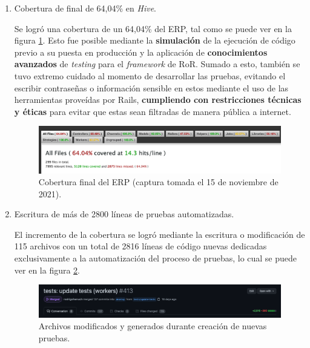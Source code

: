   \begin{enumerate}
    \item Cobertura de final de 64,04\% en \textit{Hive}.
    
    Se logró una cobertura de un 64,04\% del ERP, tal como se puede ver en la figura \ref{fig:testing_final}. Esto fue posible mediante la \textbf{simulación} de la ejecución de código previo a su puesta en producción y la aplicación de \textbf{conocimientos avanzados} de \textit{testing} para el \textit{framework} de RoR. Sumado a esto, también se tuvo extremo cuidado al momento de desarrollar las pruebas, evitando el escribir contraseñas o información sensible en estos mediante el uso de las herramientas proveídas por Rails, \textbf{cumpliendo con restricciones técnicas y éticas} para evitar que estas sean filtradas de manera pública a internet.
    
    \begin{figure}[H]
      \centering
      \includegraphics[width=\linewidth]{figures/testing/testing_final.png}
      \caption{Cobertura final del ERP (captura tomada el 15 de noviembre de 2021).}
      \label{fig:testing_final}
    \end{figure}

    \item Escritura de más de 2800 líneas de pruebas automatizadas.
    
    El incremento de la cobertura se logró mediante la escritura o modificación de 115 archivos con un total de 2816 líneas de código nuevas dedicadas exclusivamente a la automatización del proceso de pruebas, lo cual se puede ver en la figura \ref{fig:testing_file_commits}.

    \begin{figure}[H]
      \centering
      \includegraphics[width=\linewidth]{figures/testing/testing_file_commits.png}
      \caption{Archivos modificados y generados durante creación de nuevas pruebas.}
      \label{fig:testing_file_commits}
    \end{figure}


\end{enumerate}
